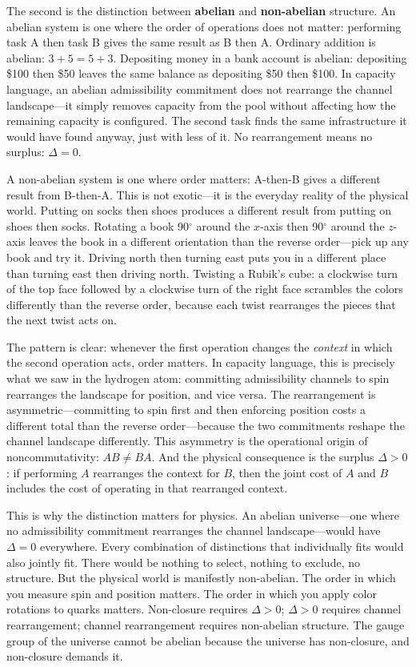 \documentclass[11pt]{article}
\begin{document}
The second is the distinction between \textbf{abelian} and \textbf{non-abelian} structure.  An abelian system is one where the order of operations does not matter: performing task A then task B gives the same result as B then A.  Ordinary addition is abelian: $3 + 5 = 5 + 3$.  Depositing money in a bank account is abelian: depositing \$100 then \$50 leaves the same balance as depositing \$50 then \$100.  In capacity language, an abelian admissibility commitment does not rearrange the channel landscape---it simply removes capacity from the pool without affecting how the remaining capacity is configured.  The second task finds the same infrastructure it would have found anyway, just with less of it.  No rearrangement means no surplus: $\Delta = 0$.

A non-abelian system is one where order matters: A-then-B gives a different result from B-then-A.  This is not exotic---it is the everyday reality of the physical world.  Putting on socks then shoes produces a different result from putting on shoes then socks.  Rotating a book 90$^\circ$ around the $x$-axis then 90$^\circ$ around the $z$-axis leaves the book in a different orientation than the reverse order---pick up any book and try it.  Driving north then turning east puts you in a different place than turning east then driving north.  Twisting a Rubik's cube: a clockwise turn of the top face followed by a clockwise turn of the right face scrambles the colors differently than the reverse order, because each twist rearranges the pieces that the next twist acts on.

The pattern is clear: whenever the first operation changes the \emph{context} in which the second operation acts, order matters.  In capacity language, this is precisely what we saw in the hydrogen atom: committing admissibility channels to spin rearranges the landscape for position, and vice versa.  The rearrangement is asymmetric---committing to spin first and then enforcing position costs a different total than the reverse order---because the two commitments reshape the channel landscape differently.  This asymmetry is the operational origin of noncommutativity: $AB \ne BA$.  And the physical consequence is the surplus $\Delta > 0$: if performing $A$ rearranges the context for $B$, then the joint cost of $A$ and $B$ includes the cost of operating in that rearranged context.

This is why the distinction matters for physics.  An abelian universe---one where no admissibility commitment rearranges the channel landscape---would have $\Delta = 0$ everywhere.  Every combination of distinctions that individually fits would also jointly fit.  There would be nothing to select, nothing to exclude, no structure.  But the physical world is manifestly non-abelian.  The order in which you measure spin and position matters.  The order in which you apply color rotations to quarks matters.  Non-closure requires $\Delta > 0$; $\Delta > 0$ requires channel rearrangement; channel rearrangement requires non-abelian structure.  The gauge group of the universe cannot be abelian because the universe has non-closure, and non-closure demands it.
\end{document}
